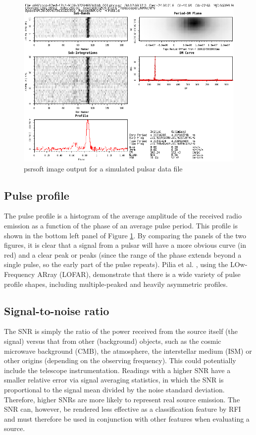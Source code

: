 \documentclass[12pt]{article}
\begin{document}
\begin{figure}[h!]
\begin{center}
\includegraphics[scale=0.4]{d86fcccd-97ed-47c4-9128-37284853d1bb_001.png}
\caption{psrsoft image output for a simulated pulsar data file}
\label{psrsoftsim}
\end{center}
\end{figure}

\subsection{Pulse profile}
The pulse profile is a histogram of the average amplitude of the received radio emission as a function of the phase of an average pulse period. This profile is shown in the bottom left panel of Figure \ref{psrsoftsim}. By comparing the panels of the two figures, it is clear that a signal from a pulsar will have a more obvious curve (in red) and a clear peak or peaks (since the range of the phase extends beyond a single pulse, so the early part of the pulse repeats). Pilia et al. \cite{pilia2016wide}, using the LOw-Frequency ARray (LOFAR), demonstrate that there is a wide variety of pulse profile shapes, including multiple-peaked and heavily asymmetric profiles.

\subsection{Signal-to-noise ratio}
The SNR is simply the ratio of the power received from the source itself (the signal) versus that from other (background) objects, such as the cosmic microwave background (CMB), the atmosphere, the interstellar medium (ISM) or other origins (depending on the observing frequency). This could potentially include the telescope instrumentation. Readings with a higher SNR have a smaller relative error via signal averaging statistics, in which the SNR is proportional to the signal mean divided by the noise standard deviation. Therefore, higher SNRs are more likely to represent real source emission. The SNR can, however, be rendered less effective as a classification feature by RFI \cite{zhu2014searching} and must therefore be used in conjunction with other features when evaluating a source.
\end{document}
